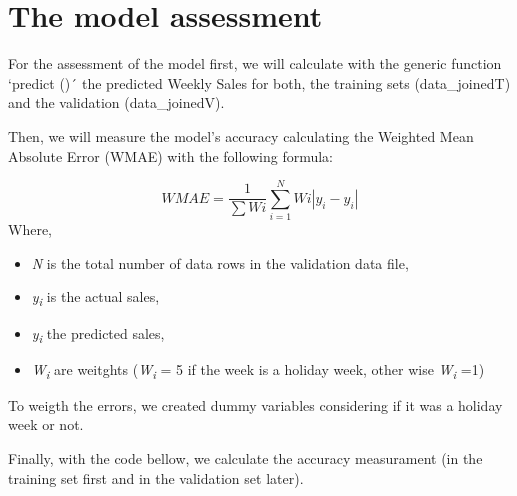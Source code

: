 \documentclass[11pt,]{article}
\newenvironment{Shaded}{\begin{snugshade}}{\end{snugshade}}
\newcommand{\KeywordTok}[1]{\textcolor[rgb]{0.13,0.29,0.53}{\textbf{{#1}}}}
\newcommand{\DataTypeTok}[1]{\textcolor[rgb]{0.13,0.29,0.53}{{#1}}}
\newcommand{\StringTok}[1]{\textcolor[rgb]{0.31,0.60,0.02}{{#1}}}
\newcommand{\CommentTok}[1]{\textcolor[rgb]{0.56,0.35,0.01}{\textit{{#1}}}}
\newcommand{\NormalTok}[1]{{#1}}
\providecommand{\tightlist}{%
  \setlength{\itemsep}{0pt}\setlength{\parskip}{0pt}}
\begin{document}
\section{The model assessment}\label{the-model-assessment}

For the assessment of the model first, we will calculate with the
generic function `predict ()´ the predicted Weekly Sales for both, the
training sets (data\_joinedT) and the validation (data\_joinedV).

\begin{Shaded}
\end{Shaded}

Then, we will measure the model's accuracy calculating the Weighted Mean
Absolute Error (WMAE) with the following formula:

\[WMAE = \frac{1}{\sum{W}i}\sum_{i=1}^N{W}i\left\lvert{y_{i}-\hat{y}_{i}}\right\rvert\]
Where,

\begin{itemize}
\tightlist
\item
  \emph{N} is the total number of data rows in the validation data file,
\item
  \emph{y\textsubscript{i}} is the actual sales,
\item
  \emph{y\textsubscript{i}} the predicted sales,
\item
  \emph{W\textsubscript{i}} are weitghts (\emph{W\textsubscript{i}} = 5
  if the week is a holiday week, other wise \emph{W\textsubscript{i}}
  =1)
\end{itemize}

To weigth the errors, we created dummy variables considering if it was a
holiday week or not.

Finally, with the code bellow, we calculate the accuracy measurament (in
the training set first and in the validation set later).
\end{document}
